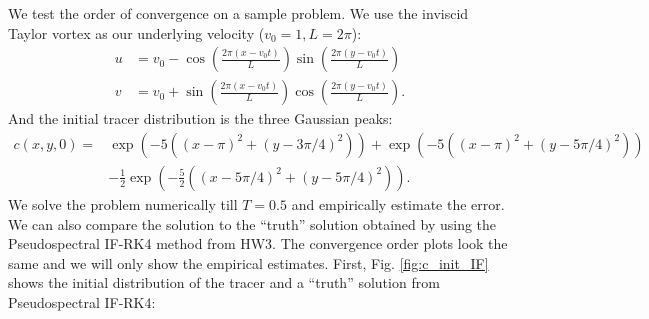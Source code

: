 \documentclass[11pt,letterpaper]{article}
\begin{document}
We test the order of convergence on a sample problem. We use the inviscid Taylor vortex as our underlying velocity ($v_0 = 1, L = 2\pi$):
\begin{align}
    u &= v_0-\cos\left(\frac{2\pi(x-v_0t)}{L}\right)\sin\left(\frac{2\pi(y-v_0t)}{L}\right)\nonumber\\
    v &= v_0+\sin\left(\frac{2\pi(x-v_0t)}{L}\right)\cos\left(\frac{2\pi(y-v_0t)}{L}\right).\label{eq:taylor}
\end{align}
And the initial tracer distribution is the three Gaussian peaks:
\begin{align}
    c(x,y,0) =& \exp\left( -5\left((x-\pi)^2+(y-3\pi/4)^2\right) \right)+\exp\left( -5\left((x-\pi)^2+(y-5\pi/4)^2\right) \right)\nonumber\\
    &-\frac{1}{2}\exp\left( -\frac{5}{2}\left((x-5\pi/4)^2+(y-5\pi/4)^2\right) \right).\label{eq:3Gauss}
\end{align}
We solve the problem numerically till $T = 0.5$ and empirically estimate the error. We can also compare the solution to the ``truth'' solution obtained by using the Pseudospectral IF-RK4 method from HW3. The convergence order plots look the same and we will only show the empirical estimates. First, Fig. \ref{fig:c_init_IF} shows the initial distribution of the tracer and a ``truth'' solution from Pseudospectral IF-RK4:
\end{document}
